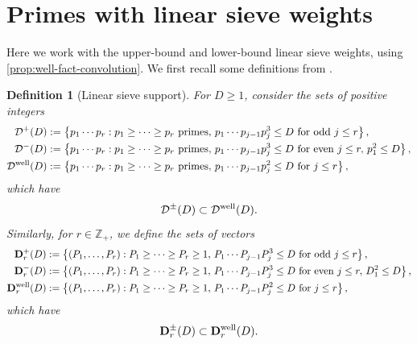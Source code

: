 \documentclass[reqno,11pt]{amsart}
\newtheorem{definition}[theorem]{Definition}
\theoremstyle{remark}
\numberwithin{equation}{section}
\newcommand{\Z}{\mathbb{Z}}
\newcommand{\bD}{\mathbf{D}}
\newcommand{\mDw}{\mathcal{D}^{\textnormal{well}}}
\newcommand{\bDw}{\mathbf{D}^{\textnormal{well}}}
\newcommand{\mD}{\mathcal{D}}
\begin{document}
\section{Primes with linear sieve weights} \label{sec:primes-linear-sieve}

Here we work with the upper-bound and lower-bound linear sieve weights, using \cref{prop:well-fact-convolution}. We first recall some definitions from \cite{maynard2025primes2,lichtman2023primes}.

\begin{definition}[Linear sieve support] \label{def:linear-sieve}
For $D \ge 1$, consider the sets of positive integers
\begin{equation} \label{eq:linear-sieve-support}
\begin{aligned}
    \mD^+(D) &:= \left\{ p_1 \cdots p_r : p_1 \ge \cdots \ge p_r \text{ primes},\, p_1 \cdots p_{j-1} p_j^3 \le D \text{ for odd } j \le r \right\},
    \\
    \mD^-(D) &:= \left\{ p_1 \cdots p_r : p_1 \ge \cdots \ge p_r \text{ primes},\, p_1 \cdots p_{j-1} p_j^3 \le D \text{ for even } j \le r,\, p_1^2 \le D \right\},
    \\
    \mDw(D) &:= \left\{ p_1 \cdots p_r : p_1 \ge \cdots \ge p_r \text{ primes},\, p_1 \cdots p_{j-1} p_j^2 \le D \text{ for } j \le r \right\},
\end{aligned}
\end{equation}
which have
\[
    \mD^\pm(D) \subset \mDw(D).
\]
Similarly, for $r \in \Z_+$, we define the sets of vectors 
\begin{equation} \label{eq:linear-sieve-vectors-support}
\begin{aligned}
    \bD_r^+(D) &:= \left\{ (P_1, \ldots, P_r) : P_1 \ge \cdots \ge P_r \ge 1,\, P_1 \cdots P_{j-1} P_j^3 \le D \text{ for odd } j \le r \right\},
    \\
    \bD_r^-(D) &:= \left\{ (P_1, \ldots, P_r) : P_1 \ge \cdots \ge P_r \ge 1,\, P_1 \cdots P_{j-1} P_j^3 \le D \text{ for even } j \le r,\, D_1^2 \le D \right\},
    \\
    \bDw_r(D) &:= \left\{ (P_1, \ldots, P_r) : P_1 \ge \cdots \ge P_r \ge 1,\, P_1 \cdots P_{j-1} P_j^2 \le D \text{ for } j \le r \right\},
\end{aligned}
\end{equation}
which have
\[
    \bD_r^\pm(D) \subset \bDw_r(D).
\]
\end{definition}
\end{document}
